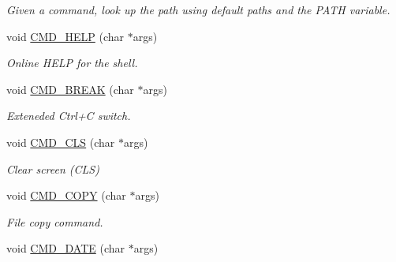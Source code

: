 \begin{DoxyCompactItemize}
\begin{DoxyCompactList}\small\item\em Given a command, look up the path using default paths and the P\-A\-T\-H variable. \end{DoxyCompactList}\item 
\hypertarget{classDOS__Shell_a5bd467ce4762cd07c612b39bf788968d}{void \hyperlink{classDOS__Shell_a5bd467ce4762cd07c612b39bf788968d}{C\-M\-D\-\_\-\-H\-E\-L\-P} (char $\ast$args)}\label{classDOS__Shell_a5bd467ce4762cd07c612b39bf788968d}

\begin{DoxyCompactList}\small\item\em Online H\-E\-L\-P for the shell. \end{DoxyCompactList}\item 
\hypertarget{classDOS__Shell_ad4c23aaf878337ed00c42a86289448e5}{void \hyperlink{classDOS__Shell_ad4c23aaf878337ed00c42a86289448e5}{C\-M\-D\-\_\-\-B\-R\-E\-A\-K} (char $\ast$args)}\label{classDOS__Shell_ad4c23aaf878337ed00c42a86289448e5}

\begin{DoxyCompactList}\small\item\em Exteneded Ctrl+\-C switch. \end{DoxyCompactList}\item 
\hypertarget{classDOS__Shell_a6564e9090602f43c480e818692ef233a}{void \hyperlink{classDOS__Shell_a6564e9090602f43c480e818692ef233a}{C\-M\-D\-\_\-\-C\-L\-S} (char $\ast$args)}\label{classDOS__Shell_a6564e9090602f43c480e818692ef233a}

\begin{DoxyCompactList}\small\item\em Clear screen (C\-L\-S) \end{DoxyCompactList}\item 
\hypertarget{classDOS__Shell_a8469d25012d305a92072cb7ea4c83bf5}{void \hyperlink{classDOS__Shell_a8469d25012d305a92072cb7ea4c83bf5}{C\-M\-D\-\_\-\-C\-O\-P\-Y} (char $\ast$args)}\label{classDOS__Shell_a8469d25012d305a92072cb7ea4c83bf5}

\begin{DoxyCompactList}\small\item\em File copy command. \end{DoxyCompactList}\item 
\hypertarget{classDOS__Shell_a71bce062b4315aef9f424b6bf10eac43}{void \hyperlink{classDOS__Shell_a71bce062b4315aef9f424b6bf10eac43}{C\-M\-D\-\_\-\-D\-A\-T\-E} (char $\ast$args)}\label{classDOS__Shell_a71bce062b4315aef9f424b6bf10eac43}


\end{DoxyCompactItemize}
